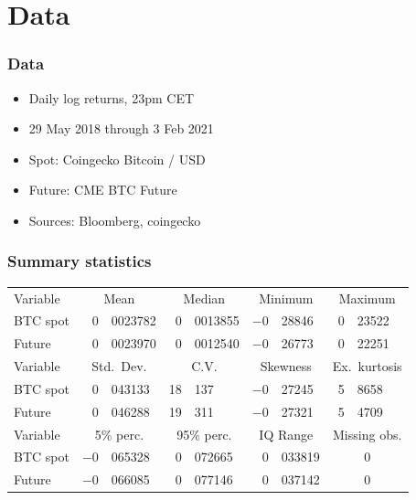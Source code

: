\documentclass[10pt,mathserif,notes=show]{beamer}
\renewcommand{\(}{\begin{columns}}
\renewcommand{\)}{\end{columns}}
\newcommand{\<}[1]{\begin{column}{#1}}
\renewcommand{\>}{\end{column}}
\theoremstyle{definition}
\begin{document}
\section{Data}

\begin{frame}
  \frametitle{Data}
  \begin{itemize}
  \item Daily log returns, 23pm CET
  \item 29 May 2018 through 3 Feb 2021
  \item Spot: Coingecko Bitcoin / USD 
  \item Future: CME BTC Future
  \item Sources: Bloomberg, coingecko
  \end{itemize}
\end{frame}

\begin{frame}
  \frametitle{Summary statistics}
  {\small%
\begin{center}

\begin{tabular}{lr@{.}lr@{.}lr@{.}lr@{.}l}
Variable & \multicolumn{2}{c}{Mean}
 & \multicolumn{2}{c}{Median}
  & \multicolumn{2}{c}{Minimum}
   & \multicolumn{2}{c}{Maximum} \\[1ex]
BTC spot& 0&0023782 & 0&0013855 & $-$0&28846 & 0&23522\\
Future & 0&0023970 & 0&0012540 & $-$0&26773 & 0&22251\\[10pt]

Variable &  \multicolumn{2}{c}{Std.\ Dev.}
 & \multicolumn{2}{c}{C.V.}
  & \multicolumn{2}{c}{Skewness}
   & \multicolumn{2}{c}{Ex.\ kurtosis} \\[1ex]
BTC spot & 0&043133 & 18&137 & $-$0&27245 & 5&8658\\
Future & 0&046288 & 19&311 & $-$0&27321 & 5&4709\\[10pt]

Variable &  \multicolumn{2}{c}{5\% perc.}
 & \multicolumn{2}{c}{95\% perc.}
  & \multicolumn{2}{c}{IQ Range}
   & \multicolumn{2}{c}{Missing obs.} \\[1ex]
BTC spot & $-$0&065328 & 0&072665 & 0&033819 & \multicolumn{2}{c}{0}\\
Future & $-$0&066085 & 0&077146 & 0&037142 & \multicolumn{2}{c}{0}\\
\end{tabular}
\end{center}
}
\end{frame}
\end{document}
